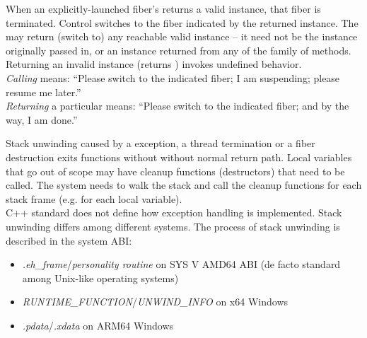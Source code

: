 When an explicitly-launched fiber's \entryfn\xspace returns a valid \fiber
instance, that fiber is terminated. Control switches to the fiber indicated by
the returned \fiber instance. The \entryfn\xspace may return (switch to) any
reachable valid \fiber instance -- it need not be the instance originally
passed in, or an instance returned from any of the \resume family of
methods.\\

Returning an invalid \fiber instance (\opbool returns ) invokes
undefined behavior.\\

\emph{Calling} \resume means: ``Please switch to the indicated fiber; I
am suspending; please resume me later.''\\

\emph{Returning} a particular \fiber means: ``Please switch to the indicated
fiber; and by the way, I am done.''



Stack unwinding caused by a exception, a thread termination or a fiber
destruction exits functions without without normal return path. Local variables
that go out of scope may have cleanup functions (destructors) that need to be called.
The system needs to walk the stack and call the cleanup functions for each stack frame
(e.g. for each local variable).\\

C++ standard does not define how exception handling is implemented. Stack unwinding differs
among different systems. The process of stack unwinding is described in the system ABI:
\begin{itemize}
    \item \emph{.eh\_frame}/\emph{personality routine} on SYS V AMD64 ABI\cite{SYSVAMD64} (de facto standard among Unix-like operating systems)
    \item \emph{RUNTIME\_FUNCTION}/\emph{UNWIND\_INFO} on x64 Windows\cite{WinX64}
    \item \emph{.pdata}/\emph{.xdata} on ARM64 Windows\cite{WinARM64}
\end{itemize}

